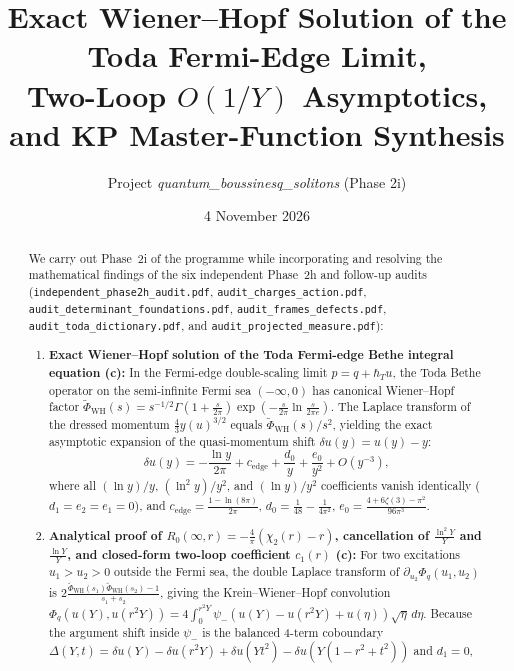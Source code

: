 \documentclass[11pt,a4paper]{article}
\title{Exact Wiener--Hopf Solution of the Toda Fermi-Edge Limit,\\
Two-Loop $O(1/Y)$ Asymptotics, and KP Master-Function Synthesis}
\author{Project \emph{quantum\_boussinesq\_solitons} (Phase 2i)}
\date{4 November 2026}
\newcommand{\Lc}{\textsf{\textbf{(c)}}}
\theoremstyle{remark}
\begin{document}
\maketitle

\begin{abstract}
We carry out Phase~2i of the programme while incorporating and resolving the
mathematical findings of the six independent Phase~2h and follow-up audits
(\texttt{independent\_\allowbreak phase2h\_\allowbreak audit.pdf},
\texttt{audit\_\allowbreak charges\_\allowbreak action.pdf},
\texttt{audit\_\allowbreak determinant\_\allowbreak foundations.pdf},
\texttt{audit\_\allowbreak frames\_\allowbreak defects.pdf},
\texttt{audit\_\allowbreak toda\_\allowbreak dictionary.pdf}, and
\texttt{audit\_\allowbreak projected\_\allowbreak measure.pdf}):
\begin{enumerate}
\item \textbf{Exact Wiener--Hopf solution of the Toda Fermi-edge Bethe integral equation \Lc:}
  In the Fermi-edge double-scaling limit $p = q + \hbar_T u$, the Toda Bethe operator on the
  semi-infinite Fermi sea $(-\infty,0)$ has canonical Wiener--Hopf factor
  $\widetilde{\Phi}_{\mathrm{WH}}(s) = s^{-1/2}\Gamma(1+\frac{s}{2\pi})\exp(-\frac{s}{2\pi}\ln\frac{s}{2\pi e})$.
  The Laplace transform of the dressed momentum $\frac{4}{3}y(u)^{3/2}$ equals
  $\widetilde{\Phi}_{\mathrm{WH}}(s)/s^2$, yielding the exact asymptotic expansion of the
  quasi-momentum shift $\delta u(y) = u(y) - y$:
  \[
    \delta u(y) = -\frac{\ln y}{2\pi} + c_{\mathrm{edge}} + \frac{d_0}{y} + \frac{e_0}{y^2} + O(y^{-3}),
  \]
  where all $(\ln y)/y$, $(\ln^2 y)/y^2$, and $(\ln y)/y^2$ coefficients vanish identically
  ($d_1 = e_2 = e_1 = 0$), and
  $c_{\mathrm{edge}} = \frac{1-\ln(8\pi)}{2\pi}$,
  $d_0 = \frac{1}{48} - \frac{1}{4\pi^2}$,
  $e_0 = \frac{4+6\zeta(3)-\pi^2}{96\pi^3}$.
\item \textbf{Analytical proof of $R_0(\infty,r) = -\frac{4}{\pi}(\chi_2(r)-r)$, cancellation of
  $\frac{\ln^2 Y}{Y}$ and $\frac{\ln Y}{Y}$, and closed-form two-loop coefficient $c_1(r)$ \Lc:}
  For two excitations $u_1 > u_2 > 0$ outside the Fermi sea, the double Laplace transform of
  $\partial_{u_2}\Phi_q(u_1,u_2)$ is $2\frac{\widetilde{\Phi}_{\mathrm{WH}}(s_1)\widetilde{\Phi}_{\mathrm{WH}}(s_2)-1}{s_1+s_2}$,
  giving the Krein--Wiener--Hopf convolution
  $\Phi_q(u(Y),u(r^2 Y)) = 4\int_0^{r^2 Y} \psi_-(u(Y)-u(r^2 Y)+u(\eta))\sqrt{\eta}\,d\eta$.
  Because the argument shift inside $\psi_-$ is the balanced 4-term coboundary
  $\Delta(Y,t) = \delta u(Y) - \delta u(r^2 Y) + \delta u(Yt^2) - \delta u(Y(1-r^2+t^2))$ and $d_1=0$,

\end{enumerate}
\end{abstract}
\end{document}
